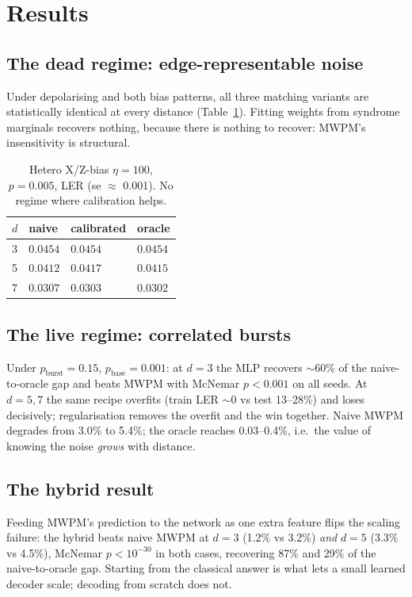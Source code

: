 \documentclass[11pt]{article}
\begin{document}
\section{Results}
\subsection{The dead regime: edge-representable noise}
Under depolarising and both bias patterns, all three matching variants
are statistically identical at every distance (Table~\ref{tab:edge}).
Fitting weights from syndrome marginals recovers nothing, because there
is nothing to recover: MWPM's insensitivity is structural.

\begin{table}[h]
\centering\begin{tabular}{llll}
\toprule
$d$ & naive & calibrated & oracle\\\midrule
3 & $0.0454$ & $0.0454$ & $0.0454$\\
5 & $0.0412$ & $0.0417$ & $0.0415$\\
7 & $0.0307$ & $0.0303$ & $0.0302$\\
\bottomrule\end{tabular}
\caption{Hetero X/Z-bias $\eta{=}100$, $p{=}0.005$, LER (se $\approx$
0.001). No regime where calibration helps.}
\label{tab:edge}
\end{table}

\subsection{The live regime: correlated bursts}
Under $p_{\mathrm{burst}}{=}0.15$, $p_{\mathrm{base}}{=}0.001$: at
$d{=}3$ the MLP recovers $\sim$60\% of the naive-to-oracle gap and beats
MWPM with McNemar $p{<}0.001$ on all seeds. At $d{=}5,7$ the same
recipe overfits (train LER $\sim$0 vs test 13--28\%) and loses
decisively; regularisation removes the overfit and the win together.
Naive MWPM degrades from 3.0\% to 5.4\%; the oracle reaches 0.03--0.4\%,
i.e.\ the value of knowing the noise \emph{grows} with distance.

\subsection{The hybrid result}
Feeding MWPM's prediction to the network as one extra feature flips the
scaling failure: the hybrid beats naive MWPM at $d{=}3$ (1.2\% vs 3.2\%)
\emph{and} $d{=}5$ (3.3\% vs 4.5\%), McNemar $p{<}10^{-30}$ in both
cases, recovering 87\% and 29\% of the naive-to-oracle gap. Starting
from the classical answer is what lets a small learned decoder scale;
decoding from scratch does not.
\end{document}
